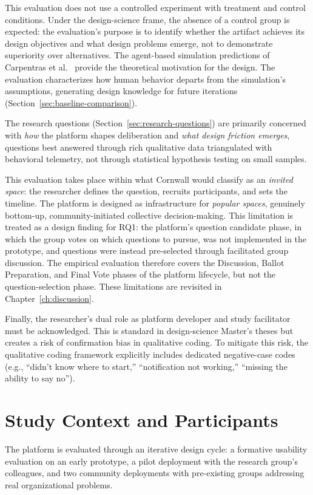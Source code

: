 \documentclass[a4paper, 12pt, twoside]{iviathesis}
\begin{document}
This evaluation does not use a controlled experiment with treatment and control conditions. Under the design-science frame, the absence of a control group is expected: the evaluation's purpose is to identify whether the artifact achieves its design objectives and what design problems emerge, not to demonstrate superiority over alternatives. The agent-based simulation predictions of Carpentras et al.\ \cite{carpentras_empowering_2024, carpentras_wisdom_2025} provide the theoretical motivation for the design. The evaluation characterizes how human behavior departs from the simulation's assumptions, generating design knowledge for future iterations (Section~\ref{sec:baseline-comparison}).

The research questions (Section~\ref{sec:research-questions}) are primarily concerned with \textit{how} the platform shapes deliberation and \textit{what design friction emerges}, questions best answered through rich qualitative data triangulated with behavioral telemetry, not through statistical hypothesis testing on small samples.

This evaluation takes place within what Cornwall \cite{cornwall2004} would classify as an \textit{invited space}: the researcher defines the question, recruits participants, and sets the timeline. The platform is designed as infrastructure for \textit{popular spaces}, genuinely bottom-up, community-initiated collective decision-making. This limitation is treated as a design finding for RQ1: the platform's question candidate phase, in which the group votes on which questions to pursue, was not implemented in the prototype, and questions were instead pre-selected through facilitated group discussion. The empirical evaluation therefore covers the Discussion, Ballot Preparation, and Final Vote phases of the platform lifecycle, but not the question-selection phase. These limitations are revisited in Chapter~\ref{ch:discussion}.

Finally, the researcher's dual role as platform developer and study facilitator must be acknowledged. This is standard in design-science Master's theses but creates a risk of confirmation bias in qualitative coding. To mitigate this risk, the qualitative coding framework explicitly includes dedicated negative-case codes (e.g., ``didn't know where to start,'' ``notification not working,'' ``missing the ability to say no'').

\section{Study Context and Participants}
The platform is evaluated through an iterative design cycle: a formative usability evaluation on an early prototype, a pilot deployment with the research group's colleagues, and two community deployments with pre-existing groups addressing real organizational problems.
\end{document}
